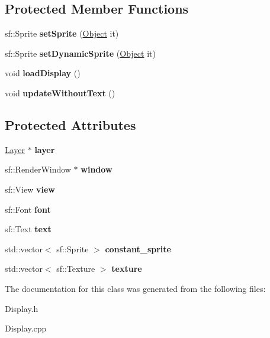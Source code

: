 \subsection*{Protected Member Functions}
\begin{DoxyCompactItemize}
\item 
\mbox{\label{class_display_aadebd92927d32d9766bc2d7bfff272f3}} 
sf\+::\+Sprite {\bfseries set\+Sprite} (\hyperlink{class_object}{Object} it)
\item 
\mbox{\label{class_display_ad7ab55961c0e45e5f4f3caddd9359b1b}} 
sf\+::\+Sprite {\bfseries set\+Dynamic\+Sprite} (\hyperlink{class_object}{Object} it)
\item 
\mbox{\label{class_display_ad0ff309e86415292e5b62e28ee658407}} 
void {\bfseries load\+Display} ()
\item 
\mbox{\label{class_display_a316e10fdc05529ec6d73f6a82aedbf3a}} 
void {\bfseries update\+Without\+Text} ()
\end{DoxyCompactItemize}
\subsection*{Protected Attributes}
\begin{DoxyCompactItemize}
\item 
\mbox{\label{class_display_a78cd676fe244dad818b5567367fdfb33}} 
\hyperlink{class_layer}{Layer} $\ast$ {\bfseries layer}
\item 
\mbox{\label{class_display_ab2bec26675f5903449716d95bb0107bd}} 
sf\+::\+Render\+Window $\ast$ {\bfseries window}
\item 
\mbox{\label{class_display_ad84f83c5fd704ce49ac3f038f07ae6dd}} 
sf\+::\+View {\bfseries view}
\item 
\mbox{\label{class_display_a2c39b9f00cdfb5f4114c5a40e8af076d}} 
sf\+::\+Font {\bfseries font}
\item 
\mbox{\label{class_display_a8369eaf8bd4706d966c7e1be78d061fe}} 
sf\+::\+Text {\bfseries text}
\item 
\mbox{\label{class_display_a1a3dd88f53281f8bc2294f33862dced0}} 
std\+::vector$<$ sf\+::\+Sprite $>$ {\bfseries constant\+\_\+sprite}
\item 
\mbox{\label{class_display_acc1a00673738d4dc7451caf213982e4d}} 
std\+::vector$<$ sf\+::\+Texture $>$ {\bfseries texture}
\end{DoxyCompactItemize}


The documentation for this class was generated from the following files\+:\begin{DoxyCompactItemize}
\item 
Display.\+h\item 
Display.\+cpp\end{DoxyCompactItemize}
